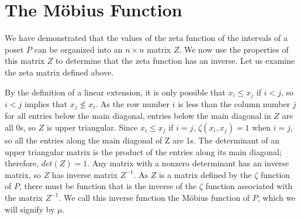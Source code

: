 \documentclass{article} %
\theoremstyle{definition}
\theoremstyle{plain}
\begin{document}

\section{The M\"{o}bius Function} %

We have demonstrated that the values of the zeta function of the intervals of a poset $P$ can be organized into an $n \times n$ matrix $Z$. We now use the properties of this matrix $Z$ to determine that the zeta function has an inverse.  Let us examine the zeta matrix defined above. %

By the definition of a linear extension, it is only possible that $x_i \leq x_j$ if $i < j$, so $i < j$ implies that $x_j \not\leq x_i$. As the row number $i$ is less than the column number $j$ for all entries below the main diagonal, entries below the main diagonal in $Z$ are all 0s, so $Z$ is upper triangular. Since $x_i \le x_j$ if $i=j$, $\zeta(x_i,x_j)=1$ when $i=j$, so all the entries along the main diagonal of Z are 1s. The determinant of an upper triangular matrix is the product of the entries along its main diagonal; therefore, $det(Z)=1$. Any matrix with a nonzero determinant has an inverse matrix, so $Z$ has inverse matrix $Z^{-1}$. As $Z$ is a matrix defined by the $\zeta$ function of $P$, there must be function that is the inverse of the $\zeta$ function associated with the matrix $Z^{-1}$. %
We call this inverse function the M\"{o}bius function of $P$, which we will signify by $\mu$.\\
\end{document}
